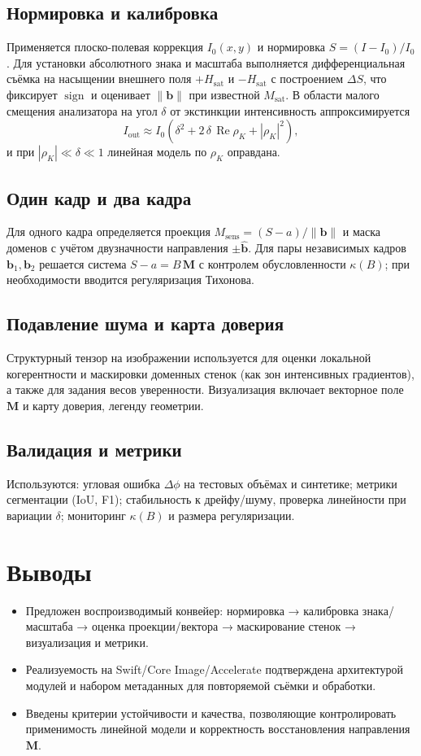 \documentclass[12pt,a4paper]{article}
\numberwithin{equation}{section}
\begin{document}
\subsection*{Нормировка и калибровка}
Применяется плоско-полевая коррекция \(I_0(x,y)\) и нормировка \(S=(I-I_0)/I_0\). Для установки абсолютного знака и масштаба выполняется дифференциальная съёмка на насыщении внешнего поля \(+H_{\text{sat}}\) и \(-H_{\text{sat}}\) с построением \(\Delta S\), что фиксирует \(\operatorname{sign}\) и оценивает \(\|\mathbf b\|\) при известной \(M_{\text{sat}}\). В области малого смещения анализатора на угол \(\delta\) от экстинкции интенсивность аппроксимируется
\[
 I_{\text{out}} \approx I_0\left(\delta^2 + 2\,\delta\,\operatorname{Re}\rho_K + |\rho_K|^2\right),
\]
и при \(|\rho_K|\ll \delta \ll 1\) линейная модель по \(\rho_K\) оправдана.

\subsection*{Один кадр и два кадра}
Для одного кадра определяется проекция \(M_{\text{sens}}=(S-a)/\|\mathbf b\|\) и маска доменов с учётом двузначности направления \(\pm\hat{\mathbf b}\). Для пары независимых кадров \(\mathbf b_1,\mathbf b_2\) решается система \(S-a=B\,\mathbf M\) с контролем обусловленности \(\kappa(B)\); при необходимости вводится регуляризация Тихонова.

\subsection*{Подавление шума и карта доверия}
Структурный тензор на изображении используется для оценки локальной когерентности и маскировки доменных стенок (как зон интенсивных градиентов), а также для задания весов уверенности. Визуализация включает векторное поле \(\mathbf M\) и карту доверия, легенду геометрии.

\subsection*{Валидация и метрики}
Используются: угловая ошибка \(\Delta\phi\) на тестовых объёмах и синтетике; метрики сегментации (IoU, F1); стабильность к дрейфу/шуму, проверка линейности при вариации \(\delta\); мониторинг \(\kappa(B)\) и размера регуляризации.

\section{Выводы}
\begin{itemize}
  \item Предложен воспроизводимый конвейер: нормировка → калибровка знака/масштаба → оценка проекции/вектора → маскирование стенок → визуализация и метрики.
  \item Реализуемость на Swift/Core Image/Accelerate подтверждена архитектурой модулей и набором метаданных для повторяемой съёмки и обработки.
  \item Введены критерии устойчивости и качества, позволяющие контролировать применимость линейной модели и корректность восстановления направления \(\mathbf M\).
\end{itemize}
\end{document}
